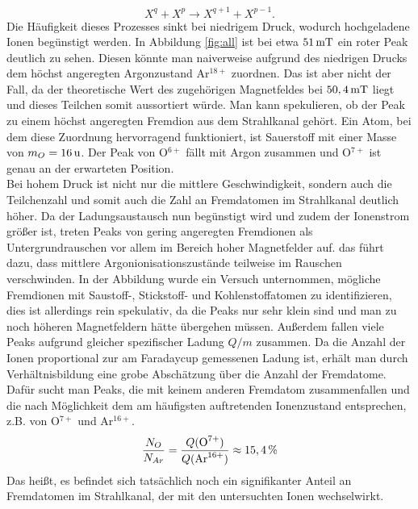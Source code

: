 		\begin{equation}
			X^{q} + X^{p} \rightarrow X^{q+1} + X^{p-1}.
		\end{equation}
		Die Häufigkeit dieses Prozesses sinkt bei niedrigem Druck, wodurch hochgeladene Ionen begünstigt werden. In Abbildung \ref{fig:all} ist bei etwa $\unit[51]{mT}$ ein roter Peak deutlich zu sehen. Diesen könnte man naiverweise aufgrund des niedrigen Drucks dem höchst angeregten Argonzustand Ar$^{18+}$ zuordnen. Das ist aber nicht der Fall, da der theoretische Wert des zugehörigen Magnetfeldes bei $\unit[50,4]{mT}$ liegt und dieses Teilchen somit aussortiert würde. Man kann spekulieren, ob der Peak zu einem höchst angeregten Fremdion aus dem Strahlkanal gehört. Ein Atom, bei dem diese Zuordnung hervorragend funktioniert, ist Sauerstoff mit einer Masse von $m_O = \unit[16]{u}$. Der Peak von O$^{6+}$ fällt mit Argon zusammen und O$^{7+}$ ist genau an der erwarteten Position.\\
		Bei hohem Druck ist nicht nur die mittlere Geschwindigkeit, sondern auch die Teilchenzahl und somit auch die Zahl an Fremdatomen im Strahlkanal deutlich höher. Da der Ladungsaustausch nun begünstigt wird und zudem der Ionenstrom größer ist, treten Peaks von gering angeregten Fremdionen als Untergrundrauschen vor allem im Bereich hoher Magnetfelder auf. das führt dazu, dass mittlere Argonionisationszustände teilweise im Rauschen verschwinden. In der Abbildung wurde ein Versuch unternommen, mögliche Fremdionen mit Saustoff-, Stickstoff- und Kohlenstoffatomen zu identifizieren, dies ist allerdings rein spekulativ, da die Peaks nur sehr klein sind und man zu noch höheren Magnetfeldern hätte übergehen müssen. Außerdem fallen viele Peaks aufgrund gleicher spezifischer Ladung $Q/m$ zusammen. Da die Anzahl der Ionen proportional zur am Faradaycup gemessenen Ladung ist, erhält man durch Verhältnisbildung eine grobe Abschätzung über die Anzahl der Fremdatome. Dafür sucht man Peaks, die mit keinem anderen Fremdatom zusammenfallen und die nach Möglichkeit dem am häufigsten auftretenden Ionenzustand entsprechen, z.B. von O$^{7+}$ und Ar$^{16+}$.
		\begin{equation}
			\frac{N_{O}}{N_{Ar}} = \frac{Q(\text{O}^{7+})}{Q(\text{Ar}^{16+})}\approx \unit[15,4]{\%}
		\end{equation}
		Das heißt, es befindet sich tatsächlich noch ein signifikanter Anteil an Fremdatomen im Strahlkanal, der mit den untersuchten Ionen wechselwirkt.